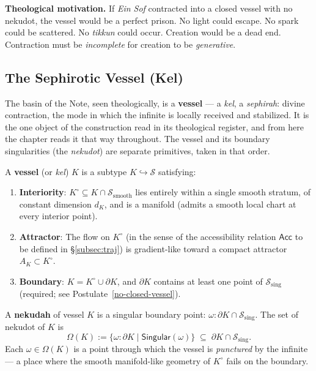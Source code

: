 \textbf{Theological motivation.} If \emph{Ein Sof} contracted into a closed vessel with no nekudot, the vessel would be a perfect prison. No light could escape. No spark could be scattered. No \emph{tikkun} could occur. Creation would be a dead end. Contraction must be \emph{incomplete} for creation to be \emph{generative}.

\subsection{The Sephirotic Vessel (Kel)}

The basin of the Note, seen theologically, is a \textbf{vessel} --- a \emph{kel}, a \emph{sephirah}: divine contraction, the mode in which the infinite is locally received and stabilized. It is the one object of the construction read in its theological register, and from here the chapter reads it that way throughout. The vessel and its boundary singularities (the \emph{nekudot}) are separate primitives, taken in that order.

\begin{definition}\label{vessel}
A \textbf{vessel} (or \emph{kel}) $K$ is a subtype $K \hookrightarrow \mathcal{S}$ satisfying:
\begin{enumerate}
    \item \textbf{Interiority}: $K^{\circ} \subseteq K \cap \mathcal{S}_{\mathrm{smooth}}$ lies entirely within a single smooth stratum, of constant dimension $d_K$, and is a manifold (admits a smooth local chart at every interior point).
    \item \textbf{Attractor}: The flow on $K^{\circ}$ (in the sense of the accessibility relation $\mathsf{Acc}$ to be defined in §\ref{subsec:traj}) is gradient-like toward a compact attractor $A_K \subset K^{\circ}$.
    \item \textbf{Boundary}: $K = K^{\circ} \cup \partial K$, and $\partial K$ contains at least one point of $\mathcal{S}_{\mathrm{sing}}$ (required; see Postulate~\ref{no-closed-vessel}).
\end{enumerate}
\end{definition}

\begin{definition}\label{def:nekudah}
A \textbf{nekudah} of vessel $K$ is a singular boundary point: $\omega : \partial K \cap \mathcal{S}_{\mathrm{sing}}$. The set of nekudot of $K$ is
\[
\Omega(K) := \{ \omega : \partial K \mid \mathsf{Singular}(\omega) \} \;\subseteq\; \partial K \cap \mathcal{S}_{\mathrm{sing}}.
\]
Each $\omega \in \Omega(K)$ is a point through which the vessel is \emph{punctured} by the infinite — a place where the smooth manifold-like geometry of $K^{\circ}$ fails on the boundary.
\end{definition}

